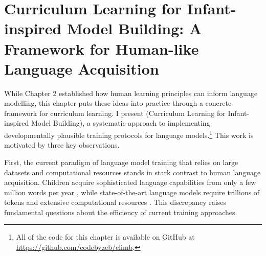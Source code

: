 \chapter{Curriculum Learning for Infant-inspired Model Building: A Framework for Human-like Language Acquisition}
\label{chapter:CLIMB}





While Chapter 2 established how human learning principles can inform language modelling, this chapter puts these ideas into practice through a concrete framework for curriculum learning. I present \climb (Curriculum Learning for Infant-inspired Model Building), a systematic approach to implementing developmentally plausible training protocols for language models.\footnote{All of the code for this chapter is available on GitHub at \url{https://github.com/codebyzeb/climb}.} This work is motivated by three key observations.

First, the current paradigm of language model training that relies on large datasets and computational resources stands in stark contrast to human language acquisition. Children acquire sophisticated language capabilities from only a few million words per year \citep{gilkerson2017mapping}, while state-of-the-art language models require trillions of tokens and extensive computational resources \citep{zhang2021need, zhao2023llmsurvey}. This discrepancy raises fundamental questions about the efficiency of current training approaches.

